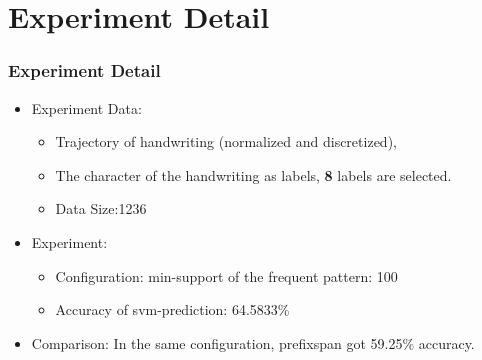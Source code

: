 \documentclass{beamer}
\begin{document}
\section{Experiment Detail}
\begin{frame}\frametitle{Experiment Detail}
\begin{itemize}
\item Experiment Data:
\begin{itemize}
\item Trajectory of handwriting (normalized and discretized),
\item The character of the handwriting as labels, \textbf{8} labels are selected. 
\item Data Size:1236
\end{itemize}
\item Experiment:
\begin{itemize}
\item Configuration: min-support of the frequent pattern: 100
\item Accuracy of svm-prediction: 64.5833\%
\end{itemize}
\item Comparison: In the same configuration, prefixspan got 59.25\% accuracy.
\end{itemize}
\end{frame}
\end{document}
